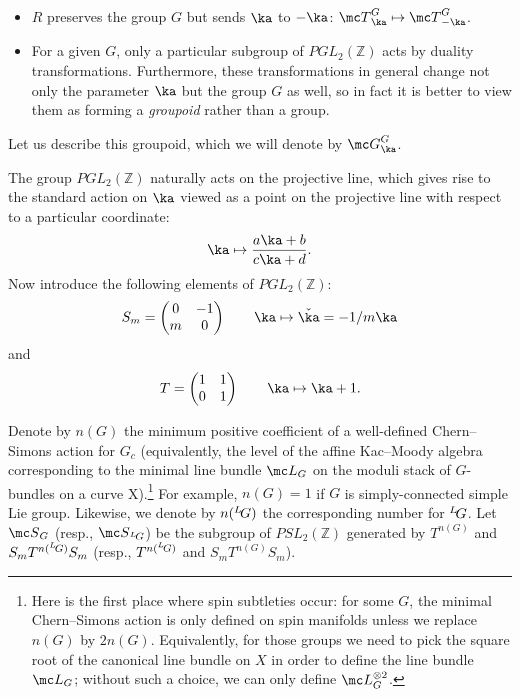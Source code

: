 \documentclass[11pt,reqno]{amsart}
\theoremstyle{plain}
\numberwithin{equation}{section}
\newcommand{\Z}{\mathbb{Z}}
\def\neg{\negthinspace}
\def\LG{{}^L\neg G}
\theoremstyle{definition}
\begin{document}
\medskip

\begin{itemize}

\item $R$ preserves the group $G$ but sends $\ka$ to $-\ka$: ${\mc
  T}^G_\ka \mapsto {\mc T}^G_{-\ka}$.

\medskip

\item For a given $G$, only a particular subgroup of $PGL_2(\Z)$ acts
  by duality transformations. Furthermore, these transformations in
  general change not only the parameter $\ka$ but the group $G$ as
  well, so in fact it is better to view them as forming a {\em
    groupoid} rather than a group.

\end{itemize}

\medskip

Let us describe this groupoid, which we will denote by ${\mc G}^G_\ka$.

The group $PGL_2(\Z)$ naturally acts on the projective line, which
gives rise to the standard action on $\ka$ viewed as a point on the
projective line with respect to a particular coordinate:
$$
\ka \mapsto \frac{a\ka+b}{c\ka+d}.
$$
Now introduce the following elements of $PGL_2(\Z)$:
$$
S_m = \begin{pmatrix}
0 & -1 \\
m & 0
\end{pmatrix} \qquad \ka \mapsto \check\ka = - 1/m\ka
$$
and
$$
T = \begin{pmatrix}
1 & 1 \\
0 & 1
\end{pmatrix} \qquad \ka \mapsto \ka+1.
$$

Denote by $n(G)$ the minimum positive coefficient of a well-defined
Chern--Simons action for $G_c$ \cite{DW} (equivalently, the level of
the affine Kac--Moody algebra corresponding to the minimal line bundle
${\mc L} _G$ on the moduli stack of $G$-bundles on a curve
X).\footnote{Here is the first place where spin subtleties occur: for
  some $G$, the minimal Chern--Simons action is only defined on spin
  manifolds unless we replace $n(G)$ by $2n(G)$. Equivalently, for
  those groups we need to pick the square root of the canonical line
  bundle on $X$ in order to define the line bundle ${\mc L}_G$;
  without such a choice, we can only define ${\mc L}_G^{\otimes 2}$.}
For example, $n(G)=1$ if $G$ is simply-connected simple Lie
group. Likewise, we denote by $n(\LG)$ the corresponding number for
$\LG$. Let ${\mc S}_G$ (resp., ${\mc S}_{\LG}$) be the subgroup of
$PSL_2(\Z)$ generated by $T^{n(G)}$ and $S_m T^{n(\LG)} S_m$ (resp.,
$T^{n(\LG)}$ and $S_m T^{n(G)} S_m$).
\end{document}
